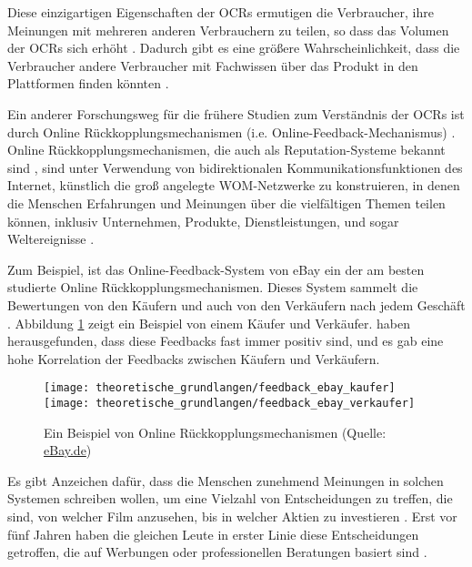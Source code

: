 Diese einzigartigen Eigenschaften der \ac{OCRs} ermutigen die Verbraucher, ihre Meinungen mit mehreren anderen Verbrauchern zu teilen, so dass das Volumen der \ac{OCRs} sich erhöht \citep{chatterjee2001online}. Dadurch gibt es eine größere Wahrscheinlichkeit, dass die Verbraucher andere Verbraucher mit Fachwissen über das Produkt in den Plattformen finden könnten \citep{duhan1997influences}. 

Ein anderer Forschungsweg für die frühere Studien zum Verständnis der \ac{OCRs} ist durch Online Rückkopplungsmechanismen (\ac{i.e.} Online-Feedback-Mechanismus) \citep{Dellarocas2003}. Online Rückkopplungsmechanismen, die auch als Reputation-Systeme bekannt sind \citep{resnick2000reputation}, sind unter Verwendung von bidirektionalen Kommunikationsfunktionen des Internet, künstlich die groß angelegte \ac{WOM}-Netzwerke zu konstruieren, in denen die Menschen Erfahrungen und Meinungen über die vielfältigen Themen teilen können, inklusiv Unternehmen, Produkte, Dienstleistungen, und sogar Weltereignisse \citep{Dellarocas2003}.

Zum Beispiel, ist das Online-Feedback-System von eBay ein der am besten studierte Online Rückkopplungsmechanismen. Dieses System sammelt die Bewertungen von den Käufern und auch von den Verkäufern nach jedem Geschäft \citep{resnick2002trust}. Abbildung \ref{fig:feedback_ebay} zeigt ein Beispiel von einem Käufer und Verkäufer. \citeauthor{resnick2002trust} haben herausgefunden, dass diese Feedbacks fast immer positiv sind, und es gab eine hohe Korrelation der Feedbacks zwischen Käufern und Verkäufern.

\begin{figure}[htb]
    \minipage{\textwidth}
    \texttt{[image: theoretische\_grundlangen/feedback\_ebay\_kaufer]}
    \endminipage\hfill
    \minipage{\textwidth}
    \texttt{[image: theoretische\_grundlangen/feedback\_ebay\_verkaufer]}
    \endminipage 
    \caption[Ein Beispiel von Online Rückkopplungsmechanismen]{Ein Beispiel von Online Rückkopplungsmechanismen (Quelle: \href{http://feedback.ebay.de/}{eBay.de})}
    \label{fig:feedback_ebay}
\end{figure}

Es gibt Anzeichen dafür, dass die Menschen zunehmend Meinungen in solchen Systemen schreiben wollen, um eine Vielzahl von Entscheidungen zu treffen, die sind, von welcher Film anzusehen, bis in welcher Aktien zu investieren \citep{guernsey2000suddenly}. Erst vor fünf Jahren haben die gleichen Leute in erster Linie diese Entscheidungen getroffen, die auf Werbungen oder professionellen Beratungen basiert sind \citep{Dellarocas2003}. 

